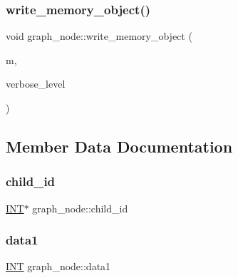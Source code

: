 \mbox{\label{classgraph__node_aaa91b8ccda069f999e10cf8bad0721ab}} 
\subsubsection{\texorpdfstring{write\+\_\+memory\+\_\+object()}{write\_memory\_object()}}
{\footnotesize\ttfamily void graph\+\_\+node\+::write\+\_\+memory\+\_\+object (\begin{DoxyParamCaption}\item[{\mbox{\hyperlink{classmemory__object}{memory\+\_\+object}} $\ast$}]{m,  }\item[{\mbox{\hyperlink{galois_8h_a09fddde158a3a20bd2dcadb609de11dc}{I\+NT}}}]{verbose\+\_\+level }\end{DoxyParamCaption})}



\subsection{Member Data Documentation}
\mbox{\label{classgraph__node_a7ebfc3f050c382bcd5f4403d31e637d2}} 
\subsubsection{\texorpdfstring{child\+\_\+id}{child\_id}}
{\footnotesize\ttfamily \mbox{\hyperlink{galois_8h_a09fddde158a3a20bd2dcadb609de11dc}{I\+NT}}$\ast$ graph\+\_\+node\+::child\+\_\+id}

\mbox{\label{classgraph__node_a6960183866d25eebc39df8fb7d3d0c7a}} 
\subsubsection{\texorpdfstring{data1}{data1}}
{\footnotesize\ttfamily \mbox{\hyperlink{galois_8h_a09fddde158a3a20bd2dcadb609de11dc}{I\+NT}} graph\+\_\+node\+::data1}


